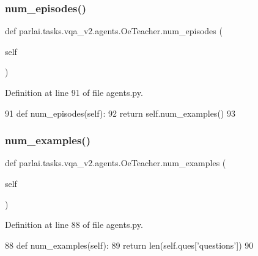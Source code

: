 \subsubsection{\texorpdfstring{num\+\_\+episodes()}{num\_episodes()}}
{\footnotesize\ttfamily def parlai.\+tasks.\+vqa\+\_\+v2.\+agents.\+Oe\+Teacher.\+num\+\_\+episodes (\begin{DoxyParamCaption}\item[{}]{self }\end{DoxyParamCaption})}



Definition at line 91 of file agents.\+py.


\begin{DoxyCode}
91     \textcolor{keyword}{def }num\_episodes(self):
92         \textcolor{keywordflow}{return} self.num\_examples()
93 
\end{DoxyCode}
\mbox{\label{classparlai_1_1tasks_1_1vqa__v2_1_1agents_1_1OeTeacher_a1285cd818eafe9267f54049cc77d9506}} 
\subsubsection{\texorpdfstring{num\+\_\+examples()}{num\_examples()}}
{\footnotesize\ttfamily def parlai.\+tasks.\+vqa\+\_\+v2.\+agents.\+Oe\+Teacher.\+num\+\_\+examples (\begin{DoxyParamCaption}\item[{}]{self }\end{DoxyParamCaption})}



Definition at line 88 of file agents.\+py.


\begin{DoxyCode}
88     \textcolor{keyword}{def }num\_examples(self):
89         \textcolor{keywordflow}{return} len(self.ques[\textcolor{stringliteral}{'questions'}])
90 
\end{DoxyCode}
\mbox{\label{classparlai_1_1tasks_1_1vqa__v2_1_1agents_1_1OeTeacher_aa20e871a24dbb851310b357a58ed4b84}} 
